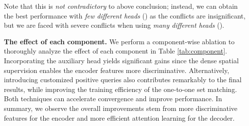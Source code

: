 Note that this is \textit{not contradictory} to above conclusion; instead, we can obtain the best performance with \textit{few different heads} () as the conflicts are insignificant, but we are faced with severe conflicts when using \textit{many different heads} ().



























\vspace{1mm}
\noindent\textbf{The effect of each component.}
We perform a component-wise ablation to thoroughly analyze the effect of each component in Table \ref{tab:component}. 
Incorporating the auxiliary head yields significant gains since the dense spatial supervision enables the encoder features more discriminative.
Alternatively, introducing customized positive queries also contributes remarkably to the final results, while improving the training efficiency of the one-to-one set matching.
Both techniques can accelerate convergence and improve performance.
In summary, we observe the overall improvements stem from more discriminative features for the encoder and more efficient attention learning for the decoder.

